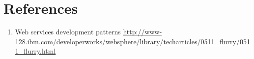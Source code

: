 \section{References}
\begin{enumerate}
 \item{Web services development patterns 
 \url{http://www-128.ibm.com/developerworks/websphere/library/techarticles/0511_flurry/0511_flurry.html}}
\end{enumerate}



